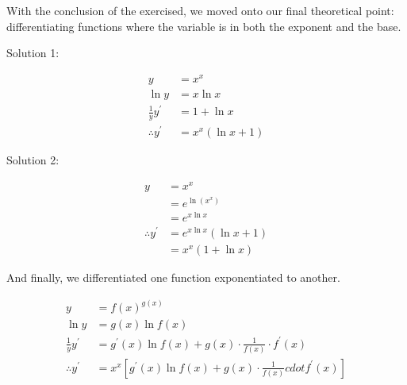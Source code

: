 \documentclass{article}
\begin{document}
\vspace{10pt}

With the conclusion of the exercised, we moved onto our final theoretical point: differentiating functions where the variable is in both the exponent and the base.

\vspace{10pt}

Solution 1:

\begin{align*}
y&=x^x\\
\ln y&=x\ln x\\
\frac{1}{y}y^\prime&=1+\ln x\\
\therefore y^\prime&=x^x(\ln x+1)
\end{align*}

Solution 2:

\begin{align*}
y&=x^x\\
&=e^{\ln(x^x)}\\
&=e^{x\ln x}\\
\therefore y^\prime&=e^{x\ln x}(\ln x+1)\\
&=x^x(1+\ln x)
\end{align*}

And finally, we differentiated one function exponentiated to another.

\begin{align*}
y&=f(x)^{g(x)}\\
\ln y&=g(x)\ln f(x)\\
\frac{1}{y}y^\prime&=g^\prime(x)\ln f(x)+g(x)\cdot\frac{1}{f(x)}\cdot f^\prime(x)\\
\therefore y^\prime&=x^x[g^\prime(x)\ln f(x)+g(x)\cdot\frac{1}{f(x)}cdot f^\prime(x)]
\end{align*}
\end{document}
